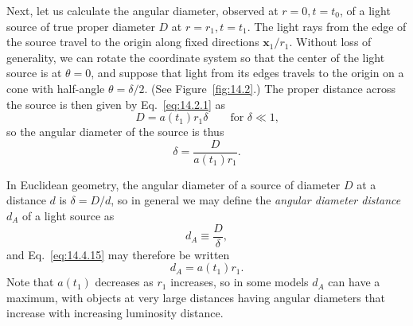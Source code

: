 Next, let us calculate the angular diameter, observed at \(r=0,t=t_0\), of a
light source of true proper diameter \(D\) at \(r=r_1,t=t_1\). The light
rays from the edge of the source travel to the origin along fixed directions
\(\mathbf{x}_1/r_1\). Without loss of generality, we can rotate the
coordinate system so that the center of the light source is at \(\theta=0\),
and suppose that light from its edges travels to the origin on a cone with
half-angle \(\theta=\delta/2\). (See Figure~\ref{fig:14.2}.) The proper
distance across the source is then given by Eq.~\eqref{eq:14.2.1} as
\[
  D=a(t_1)r_1\delta
  \qquad\text{for \(\delta\ll1\),}
\]
so the angular diameter of the source is thus
\begin{equation}
  \delta=\frac{D}{a(t_1)r_1}.
  \tag{14.4.15}\label{eq:14.4.15}
\end{equation}



In Euclidean geometry, the angular diameter of a source of diameter \(D\) at
a distance \(d\) is \(\delta=D/d\), so in general we may define the
\emph{angular diameter distance} \(d_A\) of a light source as
\begin{equation}
  d_A\equiv\frac{D}{\delta},
  \tag{14.4.16}\label{eq:14.4.16}
\end{equation}
and Eq.~\eqref{eq:14.4.15} may therefore be written
\begin{equation}
  d_A=a(t_1)r_1.
  \tag{14.4.17}\label{eq:14.4.17}
\end{equation}
Note that \(a(t_1)\) decreases as \(r_1\) increases, so in some models
\(d_A\) can have a maximum, with objects at very large distances having
angular diameters that increase with increasing luminosity distance.

